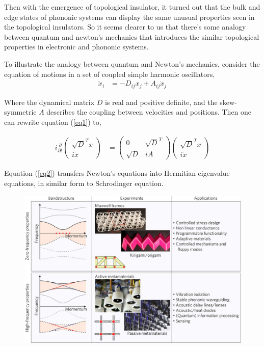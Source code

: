 \documentclass[aps,pre,preprint,groupedaddress]{revtex4-1}
\begin{document}
Then with the emergence of topological insulator, it turned out that the bulk and edge states of phononic systems can display the same unusual properties seen in the topological insulators\cite{cite-key11,cite-key12}. So it seems clearer to us that there's some analogy between quantum and newton's mechanics that introduces the similar topological properties in electronic and phononic systems.

To illustrate the analogy between quantum and Newton's mechanics, consider the equation of motions in a set of coupled simple harmonic oscillators,
\begin{align}
\ddot{x}_i &= -D_{ij}x_j+A_{ij}\dot{x}_j
\label{eq1}
\end{align}

Where the dynamical matrix $D$ is real and positive definite, and the skew-symmetric $A$ describes the coupling between velocities and positions. Then one can rewrite equation (\ref{eq1}) to,

\begin{align}
i\frac{\partial}{\partial t}
\begin{pmatrix}
\sqrt{D}^{T}x\\
i\dot{x}
\end{pmatrix}
&=
\begin{pmatrix}
0 & \sqrt{D}^{T}\\
\sqrt{D} & iA
\end{pmatrix}
\begin{pmatrix}
\sqrt{D}^{T}x\\
i\dot{x}
\end{pmatrix}
\label{eq2}
\end{align}

Equation (\ref{eq2}) transfers Newton's equations into Hermitian eigenvalue equations, in similar form to Schrodinger equation.

\begin{figure}
\centering
\includegraphics[scale=0.4]{nphys3801-f1.jpg}
\caption{\label{}}
\end{figure}
\end{document}
